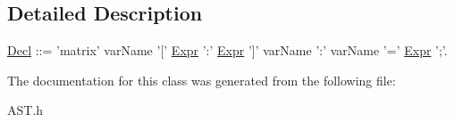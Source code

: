 \subsection{Detailed Description}
\hyperlink{classDecl}{Decl} \-:\-:= 'matrix' var\-Name '\mbox{[}' \hyperlink{classExpr}{Expr} '\-:' \hyperlink{classExpr}{Expr} '\mbox{]}' var\-Name '\-:' var\-Name '=' \hyperlink{classExpr}{Expr} ';'. 

The documentation for this class was generated from the following file\-:\begin{DoxyCompactItemize}
\item 
A\-S\-T.\-h\end{DoxyCompactItemize}

